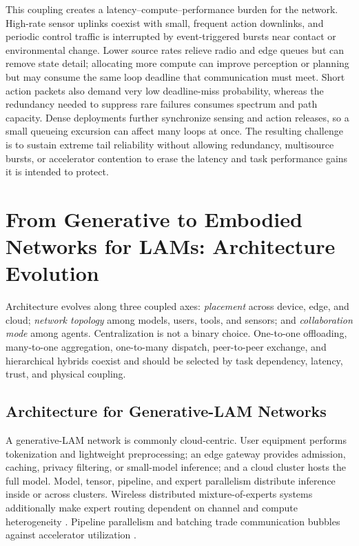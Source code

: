 \documentclass[letterpaper,journal]{IEEEtran}
\begin{document}
This coupling creates a latency--compute--performance burden for the network.
High-rate sensor uplinks coexist with small, frequent action downlinks, and
periodic control traffic is interrupted by event-triggered bursts near contact
or environmental change. Lower source rates relieve radio and edge queues but
can remove state detail; allocating more compute can improve perception or
planning but may consume the same loop deadline that communication must meet.
Short action packets also demand very low deadline-miss probability, whereas
the redundancy needed to suppress rare failures consumes spectrum and path
capacity. Dense deployments further synchronize sensing and action releases,
so a small queueing excursion can affect many loops at once. The resulting
challenge is to sustain extreme tail reliability without allowing redundancy,
multisource bursts, or accelerator contention to erase the latency and task
performance gains it is intended to protect.

\section{From Generative to Embodied Networks for LAMs: Architecture Evolution}
\label{sec:architecture}

Architecture evolves along three coupled axes: \emph{placement} across device,
edge, and cloud; \emph{network topology} among models, users, tools, and
sensors; and \emph{collaboration mode} among agents. Centralization is not a
binary choice. One-to-one offloading, many-to-one aggregation, one-to-many
dispatch, peer-to-peer exchange, and hierarchical hybrids coexist and should be
selected by task dependency, latency, trust, and physical coupling.

\subsection{Architecture for Generative-LAM Networks}
A generative-LAM network is commonly cloud-centric. User equipment performs
tokenization and lightweight preprocessing; an edge gateway provides
admission, caching, privacy filtering, or small-model inference; and a cloud
cluster hosts the full model. Model, tensor, pipeline, and expert parallelism
distribute inference inside or across clusters. Wireless distributed
mixture-of-experts systems additionally make expert routing dependent on
channel and compute heterogeneity \cite{wdmoe}. Pipeline parallelism and
batching trade communication bubbles against accelerator utilization
\cite{pipeline}.
\end{document}
